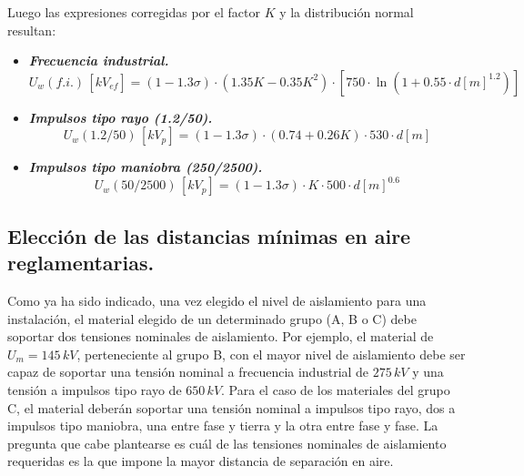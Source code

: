             Luego las expresiones corregidas por el factor $K$ y la distribución normal resultan:
            \begin{itemize}
                \item \textit{\textbf{Frecuencia industrial.}}
                \begin{equation}
                    U_\textit{w}(\textit{f.i.})\,[\textit{kV}_\textit{ef}]=
                    (1-1.3\sigma)\cdot(1.35K-0.35K^2)\cdot[750\cdot \ln(1+0.55\cdot d[\textit{m}]^{1.2})]
                \end{equation}

                \item \textit{\textbf{Impulsos tipo rayo (1.2/50).}}
                \begin{equation}
                    U_\textit{w}(1.2/50)\,[\textit{kV}_\textit{p}]= 
                    (1-1.3\sigma)\cdot(0.74+0.26K)\cdot 530\cdot d[\textit{m}]
                \end{equation}

                \item \textit{\textbf{Impulsos tipo maniobra (250/2500).}}
                \begin{equation}
                    U_\textit{w}(50/2500)\,[\textit{kV}_\textit{p}]= 
                    (1-1.3\sigma)\cdot K\cdot 500\cdot d[\textit{m}]^{0.6}
                \end{equation}
            \end{itemize}

        \subsection{Elección de las distancias mínimas en aire reglamentarias.}
            Como ya ha sido indicado, una vez elegido el nivel de aislamiento para una instalación, el material elegido de un determinado grupo (A, B o C) debe soportar dos tensiones nominales de aislamiento. Por ejemplo, el material de $U_\textit{m}=145\,\textit{kV}$, perteneciente al grupo B, con el mayor nivel de aislamiento debe ser capaz de soportar una tensión nominal a frecuencia industrial de $275\,\textit{kV}$ y una tensión a impulsos tipo rayo de $650\,\textit{kV}$. Para el caso de los materiales del grupo C, el material deberán soportar una tensión nominal a impulsos tipo rayo, dos a impulsos tipo maniobra, una entre fase y tierra y la otra entre fase y fase. La pregunta que cabe plantearse es cuál de las tensiones nominales de aislamiento requeridas es la que impone la mayor distancia de separación en aire.\newline
            
